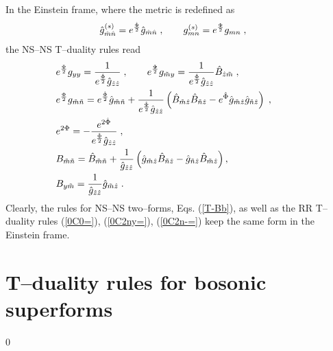 \documentclass[a4paper,11pt]{article}
\begin{document}
In the Einstein frame, where the metric is redefined as  
\begin{eqnarray}\label{Eig=g}
& \hat{g}^{(s)}_{ {\hat{m}} {\hat{n}}}= 
e^{{\hat{\Phi}\over 2}}
\hat{g}_{ {\hat{m}} {\hat{n}}}\; , \qquad 
{g}^{(s)}_{ {{m}} {{n}}}= 
e^{{\Phi\over 2}}
{g}_{ {{m}} {{n}}}\; , 
\end{eqnarray}
the NS--NS T--duality rules read 
\begin{eqnarray}\label{TrA}
& e^{{\Phi\over 2}}g_{yy}={1\over 
e^{{\hat{\Phi}\over 2}}\hat{g}_{\hat{z}\hat{z}}}\; ,
\qquad
e^{{\Phi\over 2}} {g}_{\tilde{ {m}}y}= 
{1\over e^{{\hat{\Phi}\over 2}}
\hat{g}_{\hat{z}\hat{z}}}
\hat{B}_{\hat{z}\tilde{ {m}}}\; , & 
\qquad \\ \label{TrulesA-}
& e^{{\Phi\over 2}} 
g_{\tilde{ {m}}\tilde{ {n}}} = e^{{\hat{\Phi}\over 2}}
\hat{g}_{\tilde{ {m}}\tilde{ {n}}}
+ {1\over e^{{\hat{\Phi}\over 2}} \hat{g}_{\hat{z}\hat{z}}}
\left ( {\hat{B}}_{\tilde{ {m}} \hat{z}}
{\hat{B}}_{\tilde{ {n}} \hat{z}}
- e^{\hat{\Phi}}\hat{g}_{\tilde{ {m}} \hat{z}}
\hat{g}_{\tilde{ {n}} \hat{z}}\right)\; , & \qquad
\\ \label{TdilatB}
& e^{2\Phi} =- {e^{2\hat{\Phi}}\over e^{{\hat{\Phi}\over 2}}
\hat{g}_{\hat{z}\hat{z}}}\; , & \qquad
\\ 
\label{T-Bb}
& B_{\tilde{{ {m}}}\tilde{{ {n}}}} =
\hat{B}_{\tilde{{ {m}}}\tilde{{ {n}}}}
+ {1\over \hat{g}_{\hat{z}\hat{z}}}
\left ( \hat{g}_{\tilde{{ {m}}}\hat{z}}
\hat{B}_{\tilde{ {n}} \hat{z}} -
\hat{g}_{\tilde{ {n}} \hat{z}}
\hat{B}_{\tilde{ {m}} \hat{z}}
\right), & \quad \nonumber \\ 
& B_{y\tilde{ {m}}} =
 {1\over \hat{g}_{\hat{z}\hat{z}}} 
\hat{g}_{\tilde{ {m}} \hat{z}}\; . & \qquad 
\end{eqnarray}
Clearly, the rules for NS--NS two--forms, Eqs. (\ref{T-Bb}), as well as 
the RR T--duality rules (\ref{0C0=}), (\ref{0C2ny=}), (\ref{0C2n-=})
keep the same form in the Einstein frame. 

\section{T--duality rules for bosonic  superforms} 
\setcounter{equation}0
\end{document}
